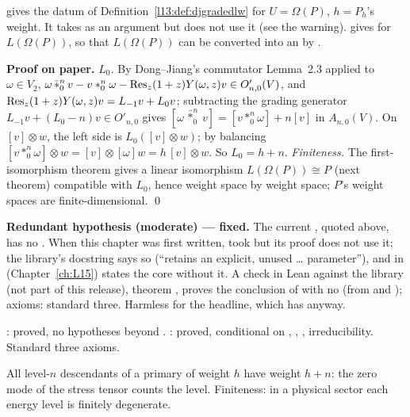 \begin{dictionary}
 gives the datum  of Definition~\ref{l13:def:djgradedlw} for $U = \Omega(P)$, $h = P_h$'s weight. It takes
 as an argument but does not use it (see the warning).  gives  for
$L(\Omega(P))$, so that $L(\Omega(P))$ can be converted into an  by .
\end{dictionary}

\textbf{Proof on paper.} \emph{$L_0$.} By Dong--Jiang's commutator Lemma~2.3 applied to $\omega\in V_2$,
$\omega\,\bar*^n_0\,v - v*^n_0\omega - \operatorname{Res}_z(1+z)Y(\omega,z)v\in O'_{n,0}(V)$, and $\operatorname{Res}_z(1+z)Y(\omega,z)v = L_{-1}v+L_0v$; subtracting
the grading generator $L_{-1}v+(L_0-n)v\in O'_{n,0}$ gives $[\omega\,\bar*^n_0\,v] = [v*^n_0\omega]+n[v]$ in $A_{n,0}(V)$. On
$[v]\otimes w$, the left side is $L_0([v]\otimes w)$; by balancing $[v*^n_0\omega]\otimes w = [v]\otimes[\omega]w = h\,[v]\otimes w$.
So $L_0 = h+n$. \emph{Finiteness.} The first-isomorphism theorem gives a linear isomorphism $L(\Omega(P))\cong P$ (next theorem)
compatible with $L_0$, hence weight space by weight space; $P$'s weight spaces are finite-dimensional. \qed

\begin{warning}
\textbf{Redundant hypothesis (moderate) --- fixed.} The current , quoted above, has no . When this chapter
was first written,  took  but
its proof does not use it; the library's docstring says so (``retains an explicit, unused \ldots{} parameter''), and
 in  (Chapter~\ref{ch:L15}) states the core without it.
A check in Lean against the library (not part of this release), theorem , proves the conclusion of  with no 
(from  and ); axioms: standard three. Harmless for the headline, which has 
anyway.
\end{warning}

\begin{status}
: proved, no hypotheses beyond . : proved, conditional on , , ,
irreducibility. Standard three axioms.
\end{status}

\begin{physics}
All level-$n$ descendants of a primary of weight $h$ have weight $h+n$: the zero mode of the stress tensor counts the level.
Finiteness: in a physical sector each energy level is finitely degenerate.
\end{physics}

